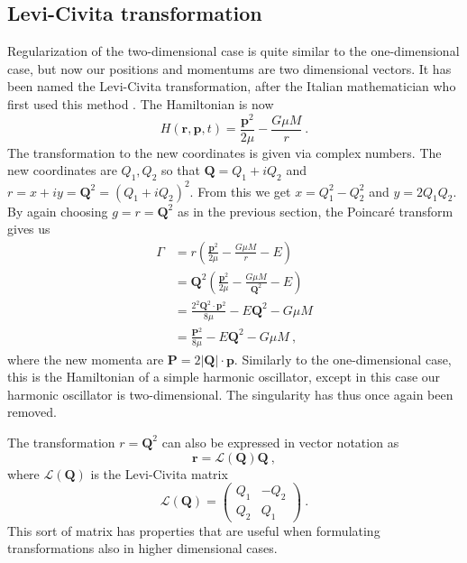 \documentclass[english, oneside]{HYgradu}
\begin{document}
\subsection{Levi-Civita transformation} \label{sect:2dregu}

Regularization of the two-dimensional case is quite similar to the one-dimensional case, but now our positions and momentums are two dimensional vectors. It has been named the Levi-Civita transformation, after the Italian mathematician who first used this method \citep{levi-civita:1920}. The Hamiltonian is now
\begin{equation}
H(\mathbf{r},\mathbf{p},t) = \frac{\mathbf{p}^2}{2 \mu} - \frac{G \mu M}{r} \ .
\end{equation}
The transformation to the new coordinates is given via complex numbers. The new coordinates are $Q_1, Q_2$ so that $\mathbf{Q} = Q_1 + iQ_2$ and $r = x + iy = \mathbf{Q}^2 = (Q_1 + iQ_2)^2$. From this we get $x = Q_1^2 - Q_2^2$ and $y = 2Q_1 Q_2$. By again choosing $g = r = \mathbf{Q}^2$ as in the previous section, the Poincaré transform gives us 
\begin{align}
\Gamma &= r \left( \frac{\mathbf{p}^2}{2 \mu} - \frac{G \mu M}{r} - E \right) \nonumber \\ 
&= \mathbf{Q}^2 \left( \frac{\mathbf{p}^2}{2 \mu} - \frac{G \mu M}{\mathbf{Q}^2} - E \right) \nonumber \\
&= \frac{2^2 \mathbf{Q}^2 \cdot \mathbf{p}^2}{8 \mu} - E \mathbf{Q}^2 - G \mu M \nonumber \\
&= \frac{\mathbf{P}^2}{8 \mu} - E \mathbf{Q}^2 - G \mu M \ ,
\end{align}
where the new momenta are $\mathbf{P} = 2 \left| \mathbf{Q} \right| \cdot \mathbf{p}$. Similarly to the one-dimensional case, this is the Hamiltonian of a simple harmonic oscillator, except in this case our harmonic oscillator is two-dimensional. The singularity has thus once again been removed.

The transformation $r = \mathbf{Q}^2$ can also be expressed in vector notation as
\begin{equation}
\mathbf{r} = \mathcal{L}(\mathbf{Q}) \mathbf{Q} \ ,
\end{equation}
where $\mathcal{L}(\mathbf{Q})$ is the Levi-Civita matrix
\begin{equation}
\mathcal{L}(\mathbf{Q}) =
\begin{pmatrix}
Q_1 & -Q_2 \\
Q_2 & Q_1
\end{pmatrix} \ .
\end{equation}
This sort of matrix has properties that are useful when formulating transformations also in higher dimensional cases.
\end{document}
